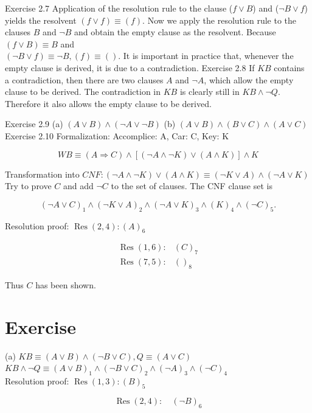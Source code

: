 \documentclass[10pt]{book}
\begin{document}
Exercise 2.7 Application of the resolution rule to the clause ($f \vee B$) and ($\neg B \vee f$) yields the resolvent $(f \vee f) \equiv(f)$. Now we apply the resolution rule to the clauses $B$ and $\neg B$ and obtain the empty clause as the resolvent. Because $(f \vee B) \equiv B$ and\\
$(\neg B \vee f) \equiv \neg B, (f) \equiv()$. It is important in practice that, whenever the empty clause is derived, it is due to a contradiction.
Exercise 2.8 If $K B$ contains a contradiction, then there are two clauses $A$ and $\neg A$, which allow the empty clause to be derived. The contradiction in $K B$ is clearly still in $K B \wedge \neg Q$. Therefore it also allows the empty clause to be derived.

Exercise 2.9 (a) $(A \vee B) \wedge(\neg A \vee \neg B)$ (b) $(A \vee B) \wedge(B \vee C) \wedge(A \vee C)$\\
Exercise 2.10 Formalization: Accomplice: A, Car: C, Key: K

$$
W B \equiv(A \Rightarrow C) \wedge[(\neg A \wedge \neg K) \vee(A \wedge K)] \wedge K
$$

Transformation into $C N F:(\neg A \wedge \neg K) \vee(A \wedge K) \equiv(\neg K \vee A) \wedge(\neg A \vee K)$\\
Try to prove $C$ and add $\neg C$ to the set of clauses. The CNF clause set is

$$
(\neg A \vee C)_{1} \wedge(\neg K \vee A)_{2} \wedge(\neg A \vee K)_{3} \wedge(K)_{4} \wedge(\neg C)_{5} .
$$

Resolution proof: $\operatorname{Res}(2,4):(A)_{6}$

$$
\begin{array}{ll}
\operatorname{Res}(1,6): & (C)_{7} \\
\operatorname{Res}(7,5): & ()_{8}
\end{array}
$$

Thus $C$ has been shown.

\section{Exercise}
(a) $K B \equiv(A \vee B) \wedge(\neg B \vee C), Q \equiv(A \vee C)$\\
$K B \wedge \neg Q \equiv(A \vee B)_{1} \wedge(\neg B \vee C)_{2} \wedge(\neg A)_{3} \wedge(\neg C)_{4}$\\
Resolution proof: $\operatorname{Res}(1,3):(B)_{5}$

$$
\operatorname{Res}(2,4): \quad(\neg B)_{6}
$$
\end{document}
